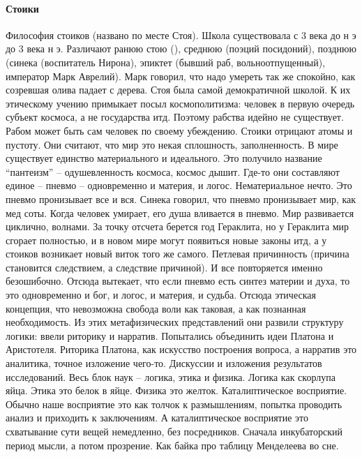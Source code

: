 \documentclass[a4paper, 12pt]{article}
\begin{document}
\paragraph{Стоики}Философия стоиков (названо по месте Стоя). Школа существовала с 3 века до н э до 3 века н э. Различают ранюю стою (), среднюю (поэций посидоний), позднюю (синека (воспитатель Нирона), эпиктет (бывший раб, вольноотпущенный), император Марк Аврелий). Марк говорил, что надо умереть так же спокойно, как созревшая олива падает с дерева. Стоя была самой демократичной школой. К их этическому учению примыкает посыл космополитизма: человек в первую очередь субъект космоса, а не государства итд. Поэтому рабства идейно не существует. Рабом может быть сам человек по своему убеждению. Стоики отрицают атомы и пустоту. Они считают, что мир это некая сплошность, заполненность. В мире существует единство материального и идеального. Это получило название ``пантеизм'' -- одушевленность космоса, космос дышит. Где-то они составляют единое -- пневмо -- одновременно и материя, и логос. Нематериальное нечто. Это пневмо пронизывает все и вся. Синека говорил, что пневмо пронизывает мир, как мед соты. Когда человек умирает, его душа вливается в пневмо. Мир развивается циклично, волнами. За точку отсчета берется год Гераклита, но у Гераклита мир сгорает полностью, и в новом мире могут появиться новые законы итд, а у стоиков возникает новый виток того же самого. Петлевая причинность (причина становится следствием, а следствие причиной). И все повторяется именно безошибочно. Отсюда вытекает, что если пневмо есть синтез материи и духа, то это одновременно и бог, и логос, и материя, и судьба. Отсюда этическая концепция, что невозможна свобода воли как таковая, а как познанная необходимость. Из этих метафизических представлений они развили структуру логики: ввели риторику и нарратив. Попытались объединить идеи Платона и Аристотеля. Риторика Платона, как искусство построения вопроса, а нарратив это аналитика, точное изложение чего-то. Дискуссии и изложения результатов исследований. Весь блок наук -- логика, этика и физика. Логика как скорлупа яйца. Этика это белок в яйце. Физика это желток. Каталиптическое восприятие. Обычно наше восприятие это как толчок к размышлениям, попытка проводить анализ и приходить к заключениям. А каталиптическое восприятие это схватывание сути вещей немедленно, без посредников. Сначала инкубаторский период мысли, а потом прозрение. Как байка про таблицу Менделеева во сне. 
\end{document}
